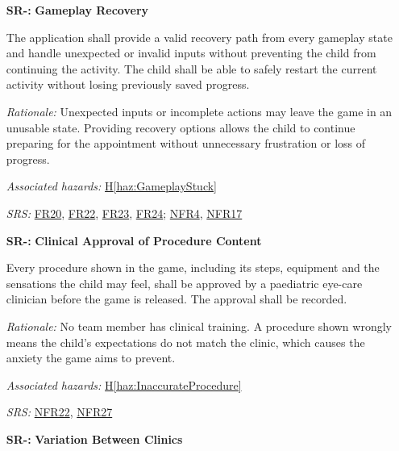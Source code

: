 \documentclass{article}
\newcounter{hazard}
\newcommand{\hazref}[1]{\hyperref[haz:#1]{H\ref*{haz:#1}}}
\newcounter{sr}
\newcommand{\srdef}[1]{\refstepcounter{sr}\label{sr:#1}\textbf{SR-\thesr:}}
\newcommand{\srsurl}{https://team-hindsight.github.io/ophthamology-game/SRS-IEEE/SRS.pdf}
\newcommand{\srsfrref}[2]{\href{\srsurl\#nameddest=#1}{FR#2}}
\newcommand{\srsnfrref}[2]{\href{\srsurl\#nameddest=#1}{NFR#2}}
\begin{document}
\begin{itemize}[leftmargin=1.5cm, labelwidth=1.3cm, labelsep=0.2cm,
  align=left, itemsep=1.2em, parsep=0.6em]
\textit{Rationale:}
Young children may repeatedly tap the screen
while interacting with the game. If multiple
inputs are processed unintentionally, the child
may skip important explanations about an
ophthalmology procedure. Preventing accidental
navigation helps ensure children receive the
necessary preparation information.

\textit{Associated hazards:}
\hazref{AccidentalInputSkipping}

\textit{SRS:} \srsfrref{FR_IgnoreRepeatedTouches}{19}; \srsnfrref{NFR_Responsiveness}{12}

\item[\srdef{GameplayRecovery}]
\textbf{Gameplay Recovery}

The application shall provide a valid recovery path from every
gameplay state and handle unexpected or invalid inputs without
preventing the child from continuing the activity. The child
shall be able to safely restart the current activity without
losing previously saved progress.

\textit{Rationale:}
Unexpected inputs or incomplete actions may leave the game
in an unusable state. Providing recovery options allows the
child to continue preparing for the appointment without
unnecessary frustration or loss of progress.

\textit{Associated hazards:}
\hazref{GameplayStuck}

\textit{SRS:} \srsfrref{FR_ExitLevel}{20}, \srsfrref{FR_ExitKeepsData}{22}, \srsfrref{FR_RestartAfterExit}{23}, \srsfrref{FR_RestartLevel}{24}; \srsnfrref{NFR_Exit}{4}, \srsnfrref{NFR_Reliability}{17}

\item[\srdef{ClinicianApproval}] \textbf{Clinical Approval of Procedure Content}

Every procedure shown in the game, including its steps, equipment and the
sensations the child may feel, shall be approved by a paediatric eye-care
clinician before the game is released. The approval shall be recorded.

\textit{Rationale:} No team member has clinical training. A procedure shown
wrongly means the child's expectations do not match the clinic, which causes
the anxiety the game aims to prevent.

\textit{Associated hazards:} \hazref{InaccurateProcedure}

\textit{SRS:} \srsnfrref{NFR_ClinicalAccuracy}{22}, \srsnfrref{NFR_Integrity}{27}

\item[\srdef{ClinicsDiffer}] \textbf{Variation Between Clinics}


\end{itemize}
\end{document}
